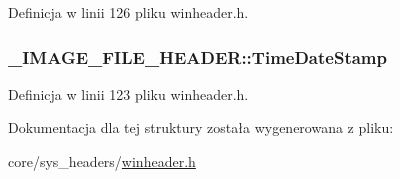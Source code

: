 Definicja w linii 126 pliku winheader.\-h.

\hypertarget{struct___i_m_a_g_e___f_i_l_e___h_e_a_d_e_r_af36d3522f4749a93453bde62c0f7732b}{
\subsubsection[{Time\-Date\-Stamp}]{ \-\_\-\-I\-M\-A\-G\-E\-\_\-\-F\-I\-L\-E\-\_\-\-H\-E\-A\-D\-E\-R\-::\-Time\-Date\-Stamp}}\label{struct___i_m_a_g_e___f_i_l_e___h_e_a_d_e_r_af36d3522f4749a93453bde62c0f7732b}


Definicja w linii 123 pliku winheader.\-h.



Dokumentacja dla tej struktury została wygenerowana z pliku\-:\begin{DoxyCompactItemize}
\item 
core/sys\-\_\-headers/\hyperlink{winheader_8h}{winheader.\-h}\end{DoxyCompactItemize}

